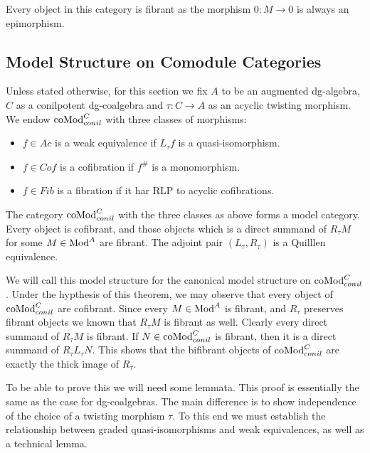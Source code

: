 \documentclass[../thesis.tex]{subfiles}
\begin{document}
            Every object in this category is fibrant as the morphism $0 : M \rightarrow 0$ is always an epimorphism.

        \subsection{Model Structure on Comodule Categories}

            Unless stated otherwise, for this section we fix $A$ to be an augmented dg-algebra, $C$ as a conilpotent dg-coalgebra and $\tau : C \rightarrow A$ as an acyclic twisting morphism. We endow $\tt{coMod}^C_{conil}$ with three classes of morphisms:
            \begin{itemize}
                \item $f\in Ac$ is a weak equivalence if $L_\tau f$ is a quasi-isomorphism.
                \item $f\in Cof$ is a cofibration if $f^\#$ is a monomorphism.
                \item $f\in Fib$ is a fibration if it har RLP to acyclic cofibrations.
            \end{itemize}

            \begin{thm}\label{thm: model-comod}
              The category $\tt{coMod}^C_{conil}$ with the three classes as above forms a model category. Every object is cofibrant, and those objects which is a direct summand of $R_\tau M$ for some $M\in \tt{Mod}^A$ are fibrant. The adjoint pair $(L_\tau, R_\tau)$ is a Quilllen equivalence.
            \end{thm}

            We will call this model structure for the canonical model structure on $\tt{coMod}^C_{conil}$. Under the hypthesis of this theorem, we may observe that every object of $\tt{coMod}^C_{conil}$ are cofibrant. Since every $M\in \tt{Mod}^A$ is fibrant, and $R_\tau$ preserves fibrant objects we known that $R_\tau M$ is fibrant as well. Clearly every direct summand of $R_\tau M$ is fibrant. If $N\in \tt{coMod}^C_{conil}$ is fibrant, then it is a direct summand of $R_\tau L_\tau N$. This shows that the bifibrant objects of $\tt{coMod}^C_{conil}$ are exactly the thick image of $R_\tau$.

            To be able to prove this we will need some lemmata. This proof is essentially the same as the case for dg-coalgebras. The main difference is to show independence of the choice of a twisting morphism $\tau$. To this end we must establish the relationship between graded quasi-isomorphisms and weak equivalences, as well as a technical lemma.
\end{document}
